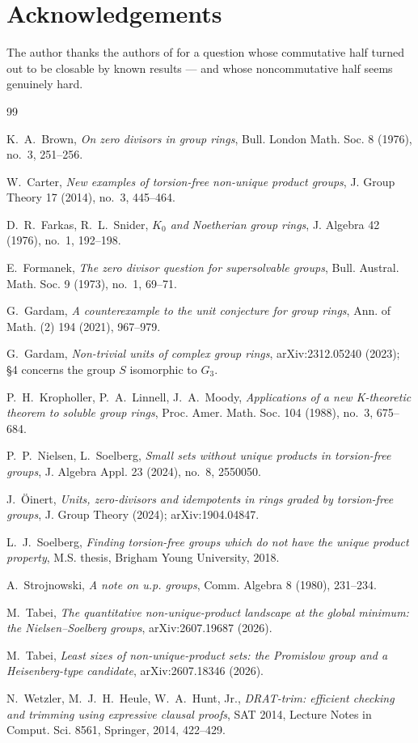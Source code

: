 \documentclass[11pt]{amsart}
\theoremstyle{definition}
\newcommand{\GThree}{G_3}
\begin{document}
\section*{Acknowledgements}
The author thanks the authors of \cite{NS} for a question whose commutative
half turned out to be closable by known results --- and whose noncommutative
half seems genuinely hard.

\begin{thebibliography}{99}

 K.~A.~Brown, \emph{On zero divisors in group rings}, Bull.
London Math. Soc. 8 (1976), no.~3, 251--256.

 W.~Carter, \emph{New examples of torsion-free non-unique
product groups}, J. Group Theory 17 (2014), no.~3, 445--464.

 D.~R.~Farkas, R.~L.~Snider, \emph{$K_0$ and Noetherian group
rings}, J. Algebra 42 (1976), no.~1, 192--198.

 E.~Formanek, \emph{The zero divisor question for
supersolvable groups}, Bull. Austral. Math. Soc. 9 (1973), no.~1, 69--71.

 G.~Gardam, \emph{A counterexample to the unit conjecture
for group rings}, Ann. of Math. (2) 194 (2021), 967--979.

 G.~Gardam, \emph{Non-trivial units of complex group
rings}, arXiv:2312.05240 (2023); \S4 concerns the group $S$ isomorphic to
$\GThree$.

 P.~H.~Kropholler, P.~A.~Linnell, J.~A.~Moody,
\emph{Applications of a new K-theoretic theorem to soluble group rings},
Proc. Amer. Math. Soc. 104 (1988), no.~3, 675--684.

 P.~P.~Nielsen, L.~Soelberg, \emph{Small sets without unique
products in torsion-free groups}, J. Algebra Appl. 23 (2024), no.~8,
2550050.

 J.~\"Oinert, \emph{Units, zero-divisors and idempotents in
rings graded by torsion-free groups}, J. Group Theory (2024);
arXiv:1904.04847.

 L.~J.~Soelberg, \emph{Finding torsion-free groups which
do not have the unique product property}, M.S. thesis, Brigham Young
University, 2018.

 A.~Strojnowski, \emph{A note on u.p. groups}, Comm.
Algebra 8 (1980), 231--234.

 M.~Tabei, \emph{The quantitative non-unique-product
landscape at the global minimum: the Nielsen--Soelberg groups},
arXiv:2607.19687 (2026).

 M.~Tabei, \emph{Least sizes of non-unique-product
sets: the Promislow group and a Heisenberg-type candidate},
arXiv:2607.18346 (2026).

 N.~Wetzler, M.~J.~H.~Heule, W.~A.~Hunt, Jr.,
\emph{DRAT-trim: efficient checking and trimming using expressive clausal
proofs}, SAT 2014, Lecture Notes in Comput. Sci. 8561, Springer, 2014,
422--429.

\end{thebibliography}
\end{document}
